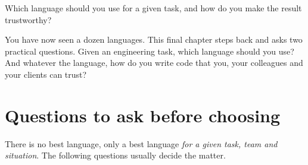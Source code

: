 \label{ch:choosing}

\begin{researchquestion}
Which language should you use for a given task, and how do you make the result trustworthy?
\end{researchquestion}

You have now seen a dozen languages. This final chapter steps back and asks two practical
questions. Given an engineering task, which language should you use? And whatever the
language, how do you write code that you, your colleagues and your clients can trust?


\section{Questions to ask before choosing}

There is no best language, only a best language \emph{for a given task, team and
situation}. The following questions usually decide the matter.

